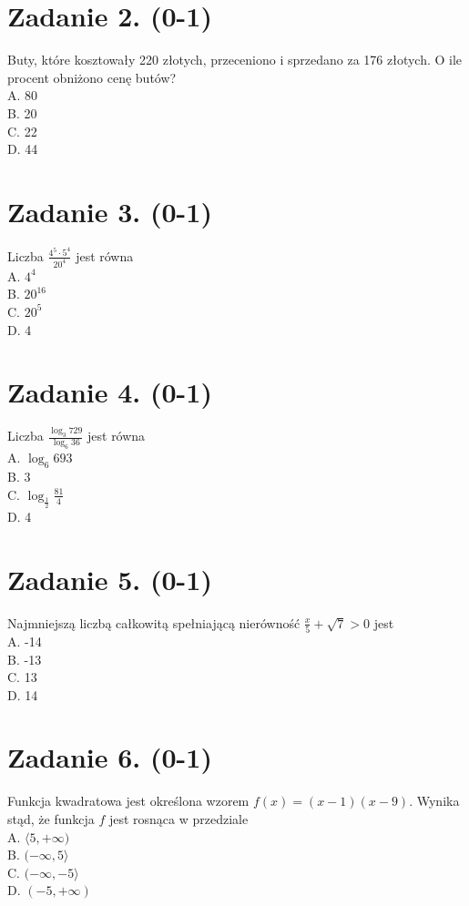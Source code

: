 \documentclass[10pt]{article}
\begin{document}
\section*{Zadanie 2. (0-1)}
Buty, które kosztowały 220 złotych, przeceniono i sprzedano za 176 złotych. O ile procent obniżono cenę butów?\\
A. 80\\
B. 20\\
C. 22\\
D. 44

\section*{Zadanie 3. (0-1)}
Liczba \(\frac{4^{5} \cdot 5^{4}}{20^{4}}\) jest równa\\
A. \(4^{4}\)\\
B. \(20^{16}\)\\
C. \(20^{5}\)\\
D. 4

\section*{Zadanie 4. (0-1)}
Liczba \(\frac{\log _{3} 729}{\log _{6} 36}\) jest równa\\
A. \(\log _{6} 693\)\\
B. 3\\
C. \(\log _{\frac{1}{2}} \frac{81}{4}\)\\
D. 4

\section*{Zadanie 5. (0-1)}
Najmniejszą liczbą całkowitą spełniającą nierówność \(\frac{x}{5}+\sqrt{7}>0\) jest\\
A. -14\\
B. -13\\
C. 13\\
D. 14

\section*{Zadanie 6. (0-1)}
Funkcja kwadratowa jest określona wzorem \(f(x)=(x-1)(x-9)\). Wynika stąd, że funkcja \(f\) jest rosnąca w przedziale\\
A. \(\langle 5,+\infty)\)\\
B. \((-\infty, 5\rangle\)\\
C. \((-\infty,-5\rangle\)\\
D. \((-5,+\infty)\)
\end{document}
